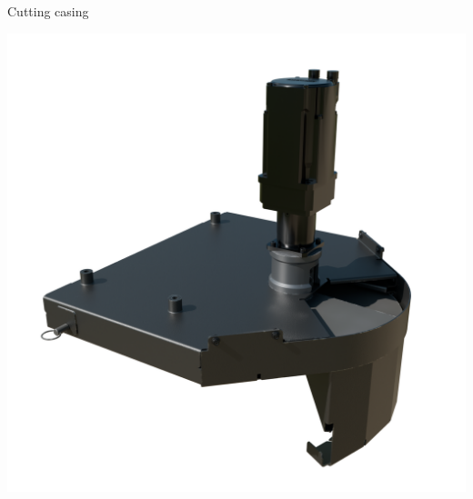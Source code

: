 \documentclass[a5paper,portrait]{article}
\begin{document}
\centering
\vspace*{2cm}
        {\color{mainblue}\sffamily\Huge Cutting casing}\\[1cm]
\begin{center}
            \includegraphics[width=1\textwidth]{../images/Chap3_Assembly.png}
\end{center}
\newpage

\newpage

\newpage

\newpage

\newpage

\newpage

\newpage

\newpage

\newpage

\newpage

\newpage

\newpage

\newpage

\newpage
\end{document}
